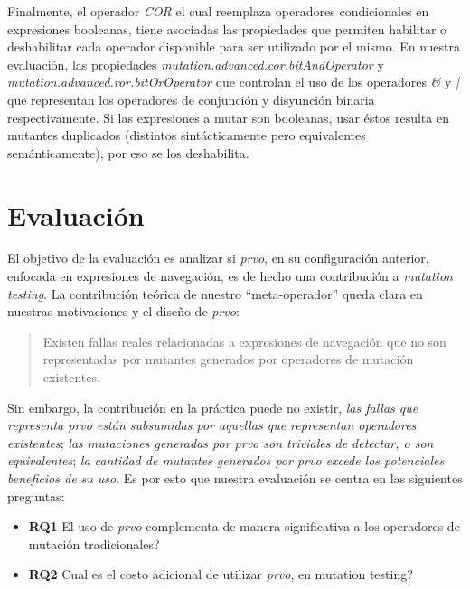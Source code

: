 Finalmente, el operador \emph{COR} el cual reemplaza operadores condicionales en expresiones booleanas, tiene asociadas las propiedades que permiten habilitar o deshabilitar cada operador disponible para ser utilizado por el mismo. En nuestra evaluaci\'on, las propiedades \emph{mutation.advanced.cor.bitAndOperator} y \emph{mutation.advanced.ror.bitOrOperator} que controlan el uso de los operadores \emph{\&} y \emph{|} que representan los operadores de conjunci\'on y disyunci\'on binaria respectivamente. Si las expresiones a mutar son booleanas, usar \'estos resulta en mutantes duplicados (distintos sint\'acticamente pero equivalentes sem\'anticamente), por eso se los deshabilita.

\section{Evaluaci\'on}
\label{sec:evaluation.evaluation}

El objetivo de la evaluaci\'on es analizar si \emph{prvo}, en su configuraci\'on anterior, enfocada en expresiones de navegaci\'on, es de hecho una contribuci\'on a \emph{mutation testing}. La contribuci\'on te\'orica de nuestro ``meta-operador'' queda clara en nuestras motivaciones y el dise\~no de \emph{prvo}:
\begin{quote}
  Existen fallas reales relacionadas a expresiones de navegaci\'on que no son representadas por mutantes generados por operadores de mutaci\'on existentes.
\end{quote}
Sin embargo, la contribuci\'on en la pr\'actica puede no existir, \emph{las fallas que representa prvo est\'an subsumidas por aquellas que representan operadores existentes}; \emph{las mutaciones generadas por prvo son triviales de detectar, o son equivalentes}; \emph{la cantidad de mutantes generados por prvo excede los potenciales beneficios de su uso}. Es por esto que nuestra evaluaci\'on se centra en las siguientes preguntas:
\begin{itemize}
	\item \textbf{RQ1} El uso de \emph{prvo} complementa de manera significativa a los operadores de mutaci\'on tradicionales?
	
	\item \textbf{RQ2} Cual es el costo adicional de utilizar \emph{prvo}, en mutation testing?
\end{itemize}

